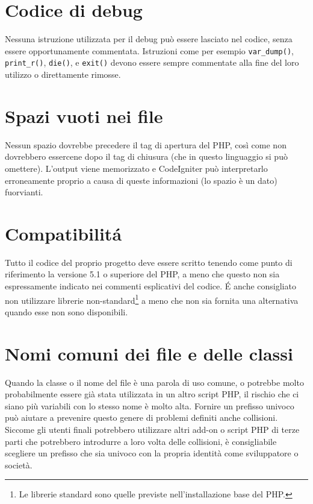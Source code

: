 \section{Codice di debug}
Nessuna istruzione utilizzata per il debug può essere lasciato nel codice, senza essere opportunamente commentata. Istruzioni come per esempio \verb|var_dump()|, \verb|print_r()|, \verb|die()|, e \verb|exit()| devono essere sempre commentate alla fine del loro utilizzo o direttamente rimosse.


\section{Spazi vuoti nei file}
Nessun spazio dovrebbe precedere il tag di apertura del PHP, così come non dovrebbero essercene dopo il tag di chiusura (che in questo linguaggio si può omettere). L'output viene memorizzato e CodeIgniter può interpretarlo erroneamente proprio a causa di queste informazioni (lo spazio è un dato) fuorvianti.

\section{Compatibilit\'a}
Tutto il codice del proprio progetto deve essere scritto tenendo come punto di riferimento la versione 5.1 o superiore del PHP, a meno che questo non sia espressamente indicato nei commenti esplicativi del codice. \'E anche consigliato non utilizzare librerie non-standard\footnote{Le librerie standard sono quelle previste nell'installazione base del PHP.} a meno che non sia fornita una alternativa quando esse non sono disponibili.

\section{Nomi comuni dei file e delle classi}
Quando la classe o il nome del file è una parola di uso comune, o potrebbe molto probabilmente essere già stata utilizzata in un altro script PHP, il rischio che ci siano più variabili con lo stesso nome è molto alta. Fornire un prefisso univoco può  aiutare a prevenire questo genere di problemi definiti anche collisioni. Siccome gli utenti finali potrebbero utilizzare altri add-on o script PHP di terze parti che potrebbero introdurre a loro volta delle collisioni, è consigliabile scegliere un prefisso che sia univoco con la propria identità come sviluppatore o società.

